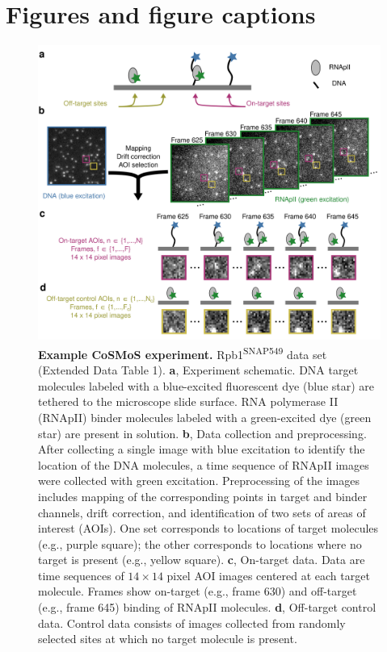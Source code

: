 \clearpage
\newpage
\section*{Figures and figure captions}
\pagebreak

\renewcommand{\figurename}{Fig.}

\begin{figure}[h]
\centering
\includegraphics[width=145mm]{figures/figure1/figure1.png}
\caption{\textbf{Example CoSMoS experiment.} Rpb1\textsuperscript{SNAP549} data set (Extended Data Table 1). \textbf{a}, Experiment schematic. DNA target molecules labeled with a blue-excited fluorescent dye (blue star) are tethered to the microscope slide surface. RNA polymerase II (RNApII) binder molecules labeled with a green-excited dye (green star) are present in solution. \textbf{b}, Data collection and preprocessing. After collecting a single image with blue excitation to identify the location of the DNA molecules, a time sequence of RNApII images were collected with green excitation.  Preprocessing of the images includes mapping of the corresponding points in target and binder channels, drift correction, and identification of two sets of areas of interest (AOIs).  One set corresponds to locations of target molecules (e.g., purple square); the other corresponds to locations where no target is present (e.g., yellow square). \textbf{c}, On-target data. Data are time sequences of $14 \times 14$ pixel AOI images centered at each target molecule. Frames show on-target (e.g., frame 630) and off-target (e.g., frame 645) binding of RNApII molecules. \textbf{d}, Off-target control data. Control data consists of images collected from randomly selected sites at which no target molecule is present. }
\label{fig:cosmos_experiment}
\end{figure}

